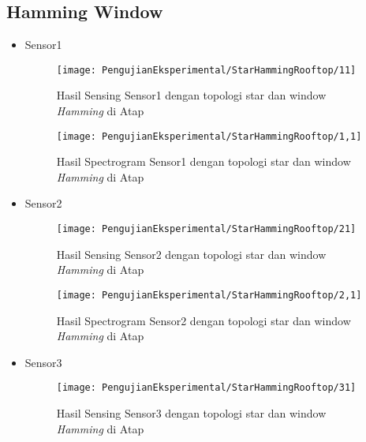 \subsection{Hamming Window}
\begin{itemize}
\item Sensor1
\begin{figure}[H]
	\centering
	\texttt{[image: PengujianEksperimental/StarHammingRooftop/11]}
	\caption[Hasil Sensing Sensor1 dengan topologi star dan window {\it Hamming} di Atap]{Hasil Sensing Sensor1 dengan topologi star dan window {\it Hamming} di Atap} 
	\label{fig:hasilAtapStarHamm11}
\end{figure}

\begin{figure}[H]
	\centering
	\texttt{[image: PengujianEksperimental/StarHammingRooftop/1,1]}
	\caption[Hasil Spectrogram Sensor1 dengan topologi star dan window {\it Hamming} di Atap]{Hasil Spectrogram Sensor1 dengan topologi star dan window {\it Hamming} di Atap} 
	\label{fig:hasilAtapStarHamm1,1}
\end{figure}

\item Sensor2
\begin{figure}[H]
	\centering
	\texttt{[image: PengujianEksperimental/StarHammingRooftop/21]}
	\caption[Hasil Sensing Sensor2 dengan topologi star dan window {\it Hamming} di Atap]{Hasil Sensing Sensor2 dengan topologi star dan window {\it Hamming} di Atap} 
	\label{fig:hasilAtapStarHamm21}
\end{figure}

\begin{figure}[H]
	\centering
	\texttt{[image: PengujianEksperimental/StarHammingRooftop/2,1]}
	\caption[Hasil Spectrogram Sensor2 dengan topologi star dan window {\it Hamming} di Atap]{Hasil Spectrogram Sensor2 dengan topologi star dan window {\it Hamming} di Atap } 
	\label{fig:hasilAtapStarHamm2,1}
\end{figure}

\item Sensor3
\begin{figure}[H]
	\centering
	\texttt{[image: PengujianEksperimental/StarHammingRooftop/31]}
	\caption[Hasil Sensing Sensor3 dengan topologi star dan window {\it Hamming} di Atap]{Hasil Sensing Sensor3 dengan topologi star dan window {\it Hamming} di Atap} 
	\label{fig:hasilAtapStarHamm31}
\end{figure}


\end{itemize}
